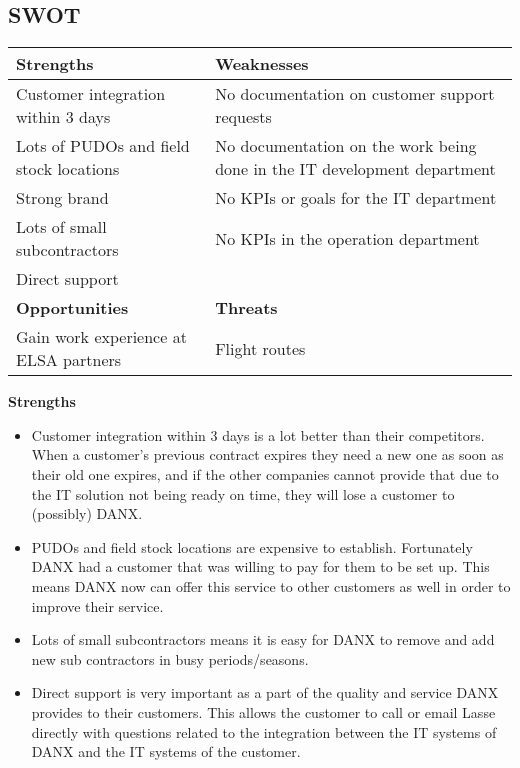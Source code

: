 \subsection{SWOT}

\begin{tabular}{| p{} | p{} |}
\hline
\textbf{Strengths} & \textbf{Weaknesses} \\ \hline
Customer integration within 3 days & No documentation on customer support requests \\ \hline
Lots of PUDOs and field stock locations & No documentation on the work being done in the IT development department\\ \hline
Strong brand & No KPIs or goals for the IT department \\ \hline
Lots of small subcontractors & No KPIs in the operation department  \\ \hline
Direct support & \\ \hline \hline
\textbf{Opportunities} & \textbf{Threats} \\ \hline
Gain work experience at ELSA partners & Flight routes \\ \hline
\end{tabular}
\qquad

\textbf{Strengths}
\begin{itemize}
\item Customer integration within 3 days is a lot better than their competitors. When a customer’s previous contract expires they need a new one as soon as their old one expires, and if the other companies cannot provide that due to the IT solution not being ready on time, they will lose a customer to (possibly) DANX.
\item PUDOs and field stock locations are expensive to establish. Fortunately DANX had a customer that was willing to pay for them to be set up. This means DANX now can offer this service to other customers as well in order to improve their service.
\item Lots of small subcontractors means it is easy for DANX to remove and add new sub contractors in busy periods/seasons. 
\item Direct support is very important as a part of the quality and service DANX provides to their customers. This allows the customer to call or email Lasse directly with questions related to the integration between the IT systems of DANX and the IT systems of the customer.
\end{itemize}


